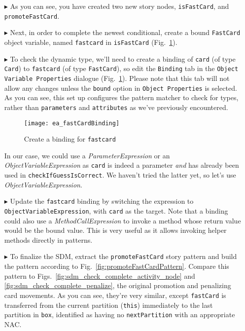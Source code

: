 \begin{itemize}
\item[$\blacktriangleright$] As you can see, you have created two new story nodes, \texttt{isFastCard}, and \texttt{promoteFastCard}.
 
\item[$\blacktriangleright$] Next, in order to complete the newest conditional, create a bound \texttt{FastCard} object variable, named \texttt{fastcard} in
\texttt{isFastCard} (Fig.~\ref{fig:fastCardBinding}).
 
\item[$\blacktriangleright$] To check the dynamic type, we'll need to create a binding of \texttt{card} (of type \texttt{Card}) to \texttt{fastcard} (of
type \texttt{FastCard}), so edit the \texttt{Binding} tab in the \texttt{Object Variable Properties} dialogue (Fig.~\ref{fig:fastCardBinding}). Please note that
this tab will not allow any changes unless the \texttt{bound} option in \texttt{Object Properties} is selected. As you can see, this set up configures the
pattern matcher to check for types, rather than \texttt{parameters} and \texttt{attributes} as we've previously encountered.

\vspace{0.5cm}

\begin{figure}[htbp]
\begin{center}
  \texttt{[image: ea\_fastCardBinding]}
  \caption{Create a binding for \texttt{fastcard}}  
  \label{fig:fastCardBinding}
\end{center}
\end{figure}

\clearpage

In our case, we could use a \emph{ParameterExpression} or an \emph{ObjectVariableExpression} as \texttt{card} is indeed a
parameter \emph{and} has already been used in \texttt{checkIfGuessIsCorrect}. We haven't tried the latter yet, so let's use \emph{ObjectVariableExpression}.

\item[$\blacktriangleright$] Update the \texttt{fastcard} binding by switching the expression to 
\texttt{Object\-Vari\-able\-Ex\-pres\-sion}, with \texttt{card} as the target. Note that a binding could also use a \emph{MethodCallExpression} to invoke a
method whose return value would be the bound value. This is very useful as it allows invoking helper methods directly in patterns.

\item[$\blacktriangleright$] To finalize the SDM, extract the \texttt{promoteFastCard} story pattern and build the pattern according to
Fig.~\ref{fig:promoteFastCardPattern}. Compare this pattern to Figs.~\ref{fig:sdm_check_complete_activity_node} and \ref{fig:sdm_check_complete_penalize}, the
original promotion and penalizing card movements. As you can see, they're very similar, except \texttt{fastCard} is transferred from the current partition
(\texttt{this}) immediately to the last partition in \texttt{box}, identified as having no \texttt{nextPartition} with an appropriate NAC.


\end{itemize}
